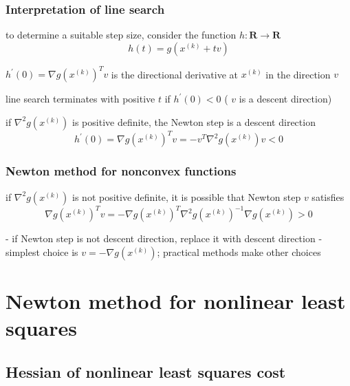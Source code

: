 \subsubsection{Interpretation of line search} 

to determine a suitable step size, consider the function $ h: \mathbf{R} \rightarrow \mathbf{R} $
\begin{equation}
h(t)=g\left(x^{(k)}+t v\right)
\end{equation}


$ h^{\prime}(0)=\nabla g\left(x^{(k)}\right)^{T} v $ is the directional derivative at $ x^{(k)} $ in the direction $ v $

line search terminates with positive $ t $ if $ h^{\prime}(0)<0 $ ( $ v $ is a descent direction)

if $ \nabla^{2} g\left(x^{(k)}\right) $ is positive definite, the Newton step is a descent direction
\begin{equation}
h^{\prime}(0)=\nabla g\left(x^{(k)}\right)^{T} v=-v^{T} \nabla^{2} g\left(x^{(k)}\right) v<0
\end{equation}

\subsubsection{Newton method for nonconvex functions}

if $ \nabla^{2} g\left(x^{(k)}\right) $ is not positive definite, it is possible that Newton step $ v $ satisfies
\begin{equation}
\nabla g\left(x^{(k)}\right)^{T} v=-\nabla g\left(x^{(k)}\right)^{T} \nabla^{2} g\left(x^{(k)}\right)^{-1} \nabla g\left(x^{(k)}\right)>0
\end{equation}


- if Newton step is not descent direction, replace it with descent direction
- simplest choice is $ v=-\nabla g\left(x^{(k)}\right) $; practical methods make other choices

\section{Newton method for nonlinear least squares}

\subsection{Hessian of nonlinear least squares cost}

